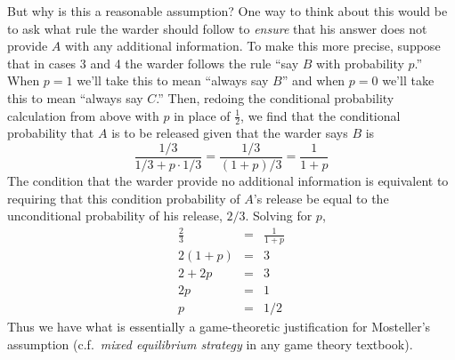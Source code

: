 \documentclass[addpoints,12pt]{exam}
\begin{document}
\begin{questions}
\begin{solution}
	But why is this a reasonable assumption? One way to think about this would be to ask what rule the warder should follow to \emph{ensure} that his answer does not provide $A$ with any additional information. To make this more precise, suppose that in cases 3 and 4 the warder follows the rule ``say $B$ with probability $p$.'' When $p=1$ we'll take this to mean ``always say $B$'' and when $p=0$ we'll take this to mean ``always say $C$.'' Then, redoing the conditional probability calculation from above with $p$ in place of $\frac{1}{2}$, we find that the conditional probability that $A$ is to be released given that the warder says $B$ is 
	$$\frac{1/3}{1/3 + p \cdot 1/3} = \frac{1/3}{(1+p)/3} = \frac{1}{1+p}$$
The condition that the warder provide no additional information is equivalent to requiring that this condition probability of $A$'s release be equal to the unconditional probability of his release, $2/3$. Solving for $p$,
	\begin{eqnarray*}
		\frac{2}{3} &=& \frac{1}{1+p}\\
		2(1+p) &=& 3\\
		2 + 2p &=& 3\\
		2p &=& 1\\
		p&=& 1/2
	\end{eqnarray*}
Thus we have what is essentially a game-theoretic justification for Mosteller's assumption (c.f.\ \emph{mixed equilibrium strategy} in any game theory textbook).
	\end{solution}
\end{questions}
\end{document}
